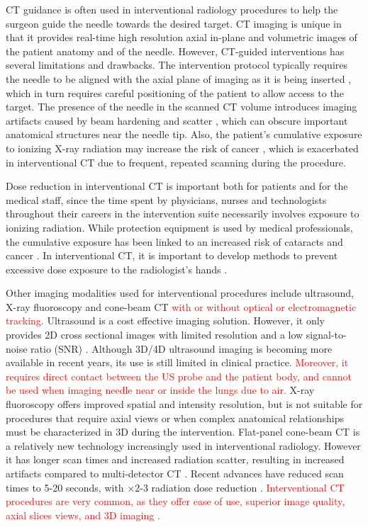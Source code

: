 CT guidance is often used in interventional radiology procedures to help the surgeon guide the needle towards the desired target. CT imaging is unique in that it provides real-time high resolution axial in-plane and volumetric images of the patient anatomy and of the needle. However, CT-guided interventions has several limitations and drawbacks. The intervention protocol typically requires the needle to be aligned with the axial plane of imaging as it is being inserted \cite{gupta2014ct}, which in turn requires careful positioning of the patient to allow access to the target.  The presence of the needle in the scanned CT volume introduces imaging artifacts caused by beam hardening and scatter \cite{boas2012ctartifacts}, which can obscure important anatomical structures near the needle tip. Also, the patient's cumulative exposure to ionizing X-ray radiation may increase the risk of cancer \cite{mettler2000ct,chodick2007excess}, which is exacerbated in interventional CT due to frequent, repeated scanning during the procedure.

Dose reduction in interventional CT is important both for patients and for the medical staff, since the time spent by physicians, nurses and technologists throughout their careers in the intervention suite necessarily involves exposure to ionizing radiation. While protection equipment is used by medical professionals, the cumulative exposure has been linked to an increased risk of cataracts and cancer \cite{miller2010occupational, sarti2012low}. In interventional CT, it is important to develop methods to prevent excessive dose exposure to the radiologist's hands \cite{stoeckelhuber2005radiation}.

Other imaging modalities used for interventional procedures include ultrasound, X-ray fluoroscopy and cone-beam CT \textcolor{red}{with or without optical or electromagnetic tracking.}
Ultrasound is a cost effective imaging solution. However, it only provides 2D cross sectional images with limited resolution and a low signal-to-noise ratio (SNR) \cite{sheafor2000comparison}. Although 3D/4D ultrasound imaging is becoming more available in recent years, its use is still limited in clinical practice. \textcolor{red}{Moreover, it requires direct contact between the US probe and the patient body, and cannot be used when imaging needle near or inside the lungs due to air.}
X-ray fluoroscopy offers improved spatial and intensity resolution, but is not suitable for procedures that require axial views or when complex anatomical relationships must be characterized in 3D during the intervention.
Flat-panel cone-beam CT is a relatively new technology increasingly used in interventional radiology. However it has longer scan times and increased radiation scatter, resulting in increased artifacts compared to multi-detector CT \cite{orth2008cbct}. Recent advances have reduced scan times to 5-20 seconds, with $\times$2-3 radiation dose reduction \cite{dynact}.
\textcolor{red}{Interventional CT procedures are very common, as they offer ease of use, superior image quality, axial slices views, and 3D imaging \cite{gupta2014ct}.}

